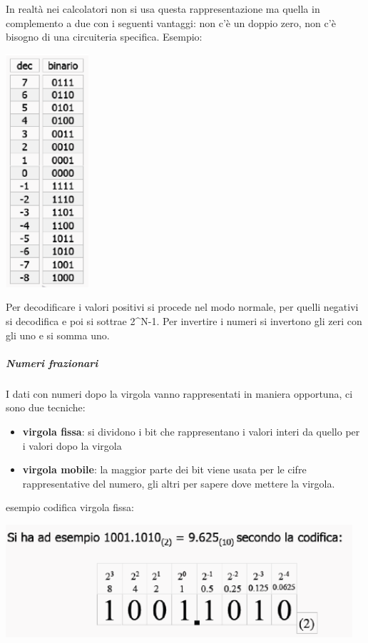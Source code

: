 \documentclass[
  paper=a4,
  oneside  ,captions=tableheading
]{scrbook}
\providecommand{\tightlist}{%
  \setlength{\itemsep}{0pt}\setlength{\parskip}{0pt}}
\begin{document}
In realtà nei calcolatori non si usa questa rappresentazione ma quella
in complemento a due con i seguenti vantaggi: non c'è un doppio zero,
non c'è bisogno di una circuiteria specifica. Esempio:

\includegraphics{./image/image-20201212111232217.png}

Per decodificare i valori positivi si procede nel modo normale, per
quelli negativi si decodifica e poi si sottrae 2\^{}N-1. Per invertire i
numeri si invertono gli zeri con gli uno e si somma uno.

\hypertarget{numeri-frazionari}{%
\subparagraph{Numeri frazionari}\label{numeri-frazionari}}

I dati con numeri dopo la virgola vanno rappresentati in maniera
opportuna, ci sono due tecniche:

\begin{itemize}
\tightlist
\item
  \textbf{virgola fissa}: si dividono i bit che rappresentano i valori
  interi da quello per i valori dopo la virgola
\item
  \textbf{virgola mobile}: la maggior parte dei bit viene usata per le
  cifre rappresentative del numero, gli altri per sapere dove mettere la
  virgola.
\end{itemize}

esempio codifica virgola fissa:

\includegraphics{./image/image-20201212112345743.png}
\end{document}
